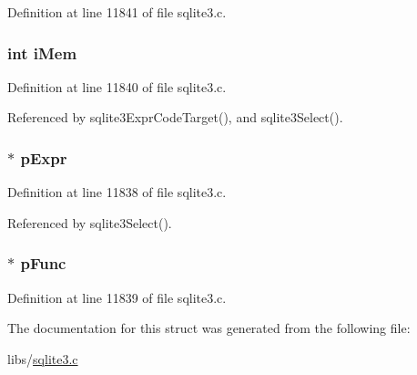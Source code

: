 Definition at line 11841 of file sqlite3.\+c.

\hypertarget{struct_agg_info_1_1_agg_info__func_a4148ebd0b3725e0aab563fee5e1c4082}{}
\subsubsection[{i\+Mem}]{\setlength{\rightskip}{0pt plus 5cm}int i\+Mem}\label{struct_agg_info_1_1_agg_info__func_a4148ebd0b3725e0aab563fee5e1c4082}


Definition at line 11840 of file sqlite3.\+c.



Referenced by sqlite3\+Expr\+Code\+Target(), and sqlite3\+Select().

\hypertarget{struct_agg_info_1_1_agg_info__func_aab4193f0accd02e4c2e5e60e105c03ca}{}
\subsubsection[{p\+Expr}]{$\ast$ p\+Expr}\label{struct_agg_info_1_1_agg_info__func_aab4193f0accd02e4c2e5e60e105c03ca}


Definition at line 11838 of file sqlite3.\+c.



Referenced by sqlite3\+Select().

\hypertarget{struct_agg_info_1_1_agg_info__func_a3859b9ebe9b2002c8ffb62f1a52e5c4d}{}
\subsubsection[{p\+Func}]{$\ast$ p\+Func}\label{struct_agg_info_1_1_agg_info__func_a3859b9ebe9b2002c8ffb62f1a52e5c4d}


Definition at line 11839 of file sqlite3.\+c.



The documentation for this struct was generated from the following file\+:\begin{DoxyCompactItemize}
\item 
libs/\hyperlink{sqlite3_8c}{sqlite3.\+c}\end{DoxyCompactItemize}

